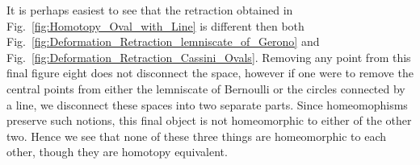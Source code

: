 \documentclass[oneside]{book}                                                  %
\begin{document}
                It is perhaps easiest to see that the retraction obtained in
                Fig.~\ref{fig:Homotopy_Oval_with_Line} is different then both
                Fig.~\ref{fig:Deformation_Retraction_lemniscate_of_Gerono} and
                Fig.~\ref{fig:Deformation_Retraction_Cassini_Ovals}. Removing
                any point from this final figure eight does not disconnect the
                space, however if one were to remove the central points from
                either the lemniscate of Bernoulli or the circles connected by a
                line, we disconnect these spaces into two separate parts. Since
                homeomophisms preserve such notions, this final object is not
                homeomorphic to either of the other two. Hence we see that none
                of these three things are homeomorphic to each other, though
                they are homotopy equivalent.
\end{document}

